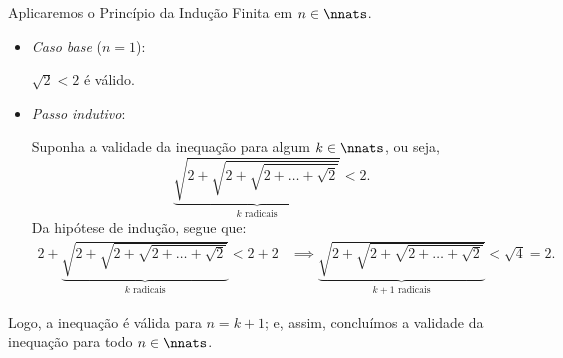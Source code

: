 \begin{solution}
Aplicaremos o Princípio da Indução Finita em $n \in \nnats$.
%
\begin{itemize}
	\item \textit{Caso base} ($n=1$):

	$\sqrt 2 < 2$ é válido.

	\item \textit{Passo indutivo}:

	Suponha a validade da inequação para algum $k \in \nnats$, ou seja, 
	\begin{equation*}
	\underbrace{\sqrt{2+\sqrt{2+\sqrt{2+ \dots + \sqrt 2}}}}_{k  \text{ radicais}} < 2.
	\end{equation*}
	Da hipótese de indução, segue que:
	\begin{align*}
	2+\underbrace{\sqrt{2+\sqrt{2+\sqrt{2+ \dots + \sqrt 2}}}}_{k  \text{ radicais}} < 2+2 & \implies \underbrace{\sqrt{2+\sqrt{2+\sqrt{2+ \dots + \sqrt 2}}}}_{k+1  \text{ radicais}} < \sqrt 4 = 2.
	\end{align*}
\end{itemize}
%
Logo, a inequação é válida para $n = k+1$; e, assim, concluímos a validade da inequação para todo $n \in \nnats$.
\end{solution}

